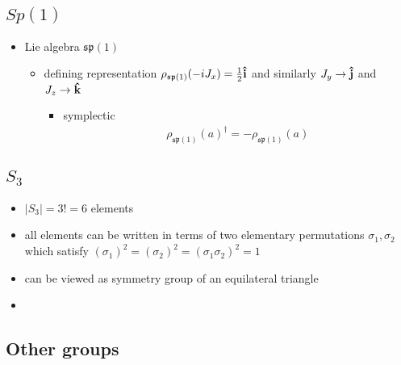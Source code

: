 \documentclass[11pt]{article}
\begin{document}
\subsection{$Sp(1)$}
\begin{itemize}
    \item Lie algebra $\mathfrak{sp}(1)$ 
        \begin{itemize}
            \item defining representation $\rho_{\mathfrak{sp}(1)}(-iJ_x) = \frac{1}{2}\vu{i}$ and similarly $J_y \to \vu{j}$ and $J_z \to \vu{k}$
            \begin{itemize}
                \item symplectic
                \begin{align*}
                    \rho_{\mathfrak{sp}(1)}(a)^\dagger = - \rho_{\mathfrak{sp}(1)}(a)
                \end{align*}
            \end{itemize}
        \end{itemize}
\end{itemize}

\subsection{$S_3$}
\begin{itemize}
    \item $|S_3| = 3! = 6$ elements 
    \item all elements can be written in terms of two elementary permutations $\sigma_1, \sigma_2$ which satisfy $(\sigma_1)^2 = (\sigma_2)^2 = (\sigma_1\sigma_2)^2 = 1$
    \item can be viewed as symmetry group of an equilateral triangle
    \item  
\end{itemize}

\subsection{Other groups}
\end{document}

